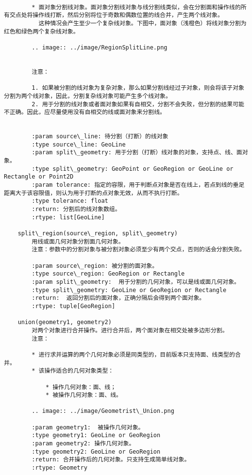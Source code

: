 \documentclass[11pt]{article}
\begin{document}
\begin{Verbatim}[commandchars=\\\{\}]
        
        * 面对象分割线对象。面对象分割线对象与线分割线类似，会在分割面和操作线的所有交点处将操作线打断，然后分别将位于奇数和偶数位置的线合并，产生两个线对象。
          这种情况会产生至少一个复杂线对象。下图中，面对象（浅橙色）将线对象分割为红色和绿色两个复杂线对象。
        
        .. image:: ../image/RegionSplitLine.png
        
        
        注意：
        
        1. 如果被分割的线对象为复杂对象，那么如果分割线经过子对象，则会将该子对象分割为两个线对象，因此，分割复杂线对象可能产生多个线对象。
        2. 用于分割的线对象或者面对象如果有自相交，分割不会失败，但分割的结果可能不正确。因此，应尽量使用没有自相交的线或面对象来分割线。
        
        
        :param source\_line: 待分割（打断）的线对象
        :type source\_line: GeoLine
        :param split\_geometry: 用于分割（打断）线对象的对象，支持点、线、面对象。
        :type split\_geometry: GeoPoint or GeoRegion or GeoLine or Rectangle or Point2D
        :param tolerance: 指定的容限，用于判断点对象是否在线上，若点到线的垂足距离大于该容限值，则认为用于打断的点对象无效，从而不执行打断。
        :type tolerance: float
        :return: 分割后的线对象数组。
        :rtype: list[GeoLine]
    
    split\_region(source\_region, split\_geometry)
        用线或面几何对象分割面几何对象。
        注意：参数中的分割对象与被分割对象必须至少有两个交点，否则的话会分割失败。
        
        :param source\_region: 被分割的面对象。
        :type source\_region: GeoRegion or Rectangle
        :param split\_geometry:  用于分割的几何对象，可以是线或面几何对象。
        :type split\_geometry: GeoLine or GeoRegion or Rectangle
        :return:  返回分割后的面对象，正确分隔后会得到两个面对象。
        :rtype: tuple[GeoRegion]
    
    union(geometry1, geometry2)
        对两个对象进行合并操作。进行合并后，两个面对象在相交处被多边形分割。
        注意：
        
        * 进行求并运算的两个几何对象必须是同类型的，目前版本只支持面、线类型的合并。
        * 该操作适合的几何对象类型：
        
            * 操作几何对象：面、线；
            * 被操作几何对象：面、线。
        
        .. image:: ../image/Geometrist\_Union.png
        
        :param geometry1:  被操作几何对象。
        :type geometry1: GeoLine or GeoRegion
        :param geometry2: 操作几何对象。
        :type geometry2: GeoLine or GeoRegion
        :return: 合并操作后的几何对象。只支持生成简单线对象。
        :rtype: Geometry
    

\end{Verbatim}
\end{document}

